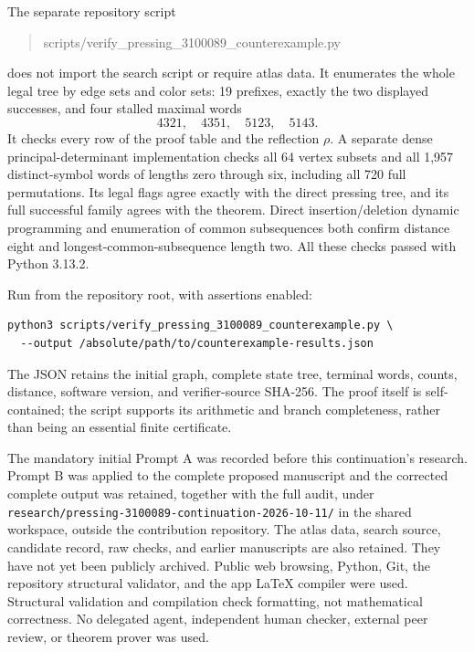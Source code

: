 \documentclass[11pt]{article}
\begin{document}
The separate repository script
\begin{quote}\ttfamily\small
scripts/verify\_pressing\_3100089\_counterexample.py
\end{quote}
does not import the search script or require atlas data. It enumerates
the whole legal tree by edge sets and color sets: 19 prefixes, exactly
the two displayed successes, and four stalled maximal words
\[
              4321,\quad4351,\quad5123,\quad5143.
\]
It checks every row of the proof table and the reflection $\rho$.
A separate dense principal-determinant implementation checks all 64
vertex subsets and all 1,957 distinct-symbol words of lengths zero
through six, including all 720 full permutations. Its legal flags
agree exactly with the direct pressing tree, and its full successful
family agrees with the theorem. Direct insertion/deletion dynamic
programming and enumeration of common subsequences both confirm
distance eight and longest-common-subsequence length two. All these
checks passed with Python 3.13.2.

Run from the repository root, with assertions enabled:
\begin{verbatim}
python3 scripts/verify_pressing_3100089_counterexample.py \
  --output /absolute/path/to/counterexample-results.json
\end{verbatim}
The JSON retains the initial graph, complete state tree, terminal words,
counts, distance, software version, and verifier-source SHA-256.
The proof itself is self-contained; the script supports its arithmetic
and branch completeness, rather than being an essential finite certificate.

The mandatory initial Prompt A was recorded before this continuation's
research. Prompt B was applied to the complete proposed manuscript and
the corrected complete output was retained, together with the full audit,
under \texttt{research/pressing-3100089-continuation-2026-10-11/} in the
shared workspace, outside the contribution repository. The atlas data,
search source, candidate record, raw checks, and earlier manuscripts are
also retained. They have not yet been publicly archived. Public web
browsing, Python, Git, the repository structural validator, and the app
LaTeX compiler were used. Structural validation and compilation check
formatting, not mathematical correctness. No delegated agent, independent
human checker, external peer review, or theorem prover was used.
\end{document}
